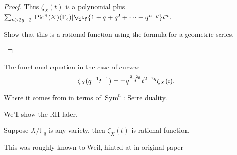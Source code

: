 \begin{proof}
Thus \(\zeta_X(t)\) is a polynomial plus
\(\sum_{n>2g-2} {\left\lvert {{\operatorname{Pic}}^n(X)({\mathbb{F}}_q)} \right\rvert}\qty{1+q+q^2+\cdots+q^{n-g}}t^n\).

\begin{exercise}

Show that this is a rational function using the formula for a geometric
series.

\end{exercise}

\end{proof}

\begin{theorem}

The functional equation in the case of curves:
\begin{align*}  
\zeta_X(q^{-1} t^{-1} ) = \pm q^{2-2g \over 2} t^{2-2g} \zeta_X(t)
.\end{align*}

\end{theorem}

\begin{exercise}[Important]

Where it comes from in terms of \(\operatorname{Sym}^n\): Serre duality.

\end{exercise}

We'll show the RH later.

\begin{theorem}[Dwork]

Suppose \(X/{\mathbb{F}}_q\) is any variety, then \(\zeta_X(t)\) is
rational function.

\end{theorem}

This was roughly known to Weil, hinted at in original paper

